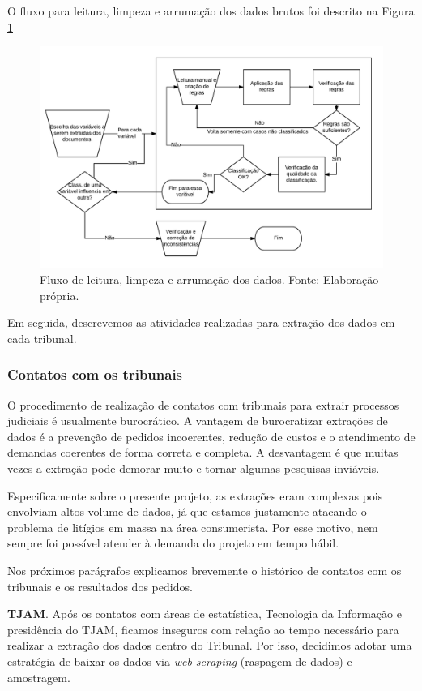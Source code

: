 \documentclass[]{report}
\begin{document}
O fluxo para leitura, limpeza e arrumação dos dados brutos foi descrito
na Figura \ref{fig:arrumacao}

\begin{figure}[htbp]
\centering
\includegraphics{imgs/classificacao.png}
\caption{Fluxo de leitura, limpeza e arrumação dos dados. Fonte:
Elaboração própria.}\label{fig:arrumacao}
\end{figure}

Em seguida, descrevemos as atividades realizadas para extração dos dados
em cada tribunal.

\subsubsection{Contatos com os tribunais}\label{contatos-tribunais}

O procedimento de realização de contatos com tribunais para extrair
processos judiciais é usualmente burocrático. A vantagem de burocratizar
extrações de dados é a prevenção de pedidos incoerentes, redução de
custos e o atendimento de demandas coerentes de forma correta e
completa. A desvantagem é que muitas vezes a extração pode demorar muito
e tornar algumas pesquisas inviáveis.

Especificamente sobre o presente projeto, as extrações eram complexas
pois envolviam altos volume de dados, já que estamos justamente atacando
o problema de litígios em massa na área consumerista. Por esse motivo,
nem sempre foi possível atender à demanda do projeto em tempo hábil.

Nos próximos parágrafos explicamos brevemente o histórico de contatos
com os tribunais e os resultados dos pedidos.

\textbf{TJAM}. Após os contatos com áreas de estatística, Tecnologia da
Informação e presidência do TJAM, ficamos inseguros com relação ao tempo
necessário para realizar a extração dos dados dentro do Tribunal. Por
isso, decidimos adotar uma estratégia de baixar os dados via \emph{web
scraping} (raspagem de dados) e amostragem.
\end{document}
